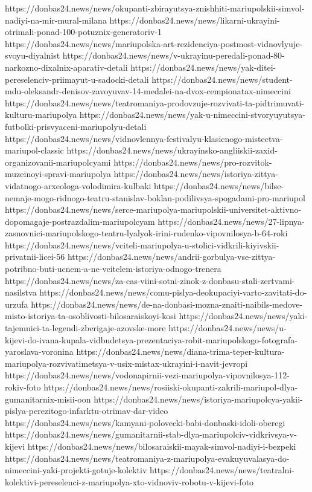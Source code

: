 https://donbas24.news/news/okupanti-zbirayutsya-znishhiti-mariupolskii-simvol-nadiyi-na-mir-mural-milana
https://donbas24.news/news/likarni-ukrayini-otrimali-ponad-100-potuznix-generatoriv-1
https://donbas24.news/news/mariupolska-art-rezidenciya-postmost-vidnovlyuje-svoyu-diyalnist
https://donbas24.news/news/v-ukrayinu-peredali-ponad-80-narkozno-dixalnix-aparativ-detali
https://donbas24.news/news/yak-ditei-pereselenciv-priimayut-u-sadocki-detali
https://donbas24.news/news/student-mdu-oleksandr-denisov-zavoyuvav-14-medalei-na-dvox-cempionatax-nimeccini
https://donbas24.news/news/teatromaniya-prodovzuje-rozvivati-ta-pidtrimuvati-kulturu-mariupolya
https://donbas24.news/news/yak-u-nimeccini-stvoryuyutsya-futbolki-prisvyaceni-mariupolyu-detali
https://donbas24.news/news/vidnovlennya-festivalyu-klasicnogo-mistectva-mariupol-classic
https://donbas24.news/news/ukrayinsko-angliiskii-zaxid-organizovanii-mariupolcyami
https://donbas24.news/news/pro-rozvitok-muzeinoyi-spravi-mariupolya
https://donbas24.news/news/istoriya-zittya-vidatnogo-arxeologa-volodimira-kulbaki
https://donbas24.news/news/bilse-nemaje-mogo-ridnogo-teatru-stanislav-boklan-podilivsya-spogadami-pro-mariupol
https://donbas24.news/news/serce-mariupolya-mariupolskii-universitet-aktivno-dopomagaje-postrazdalim-mariupolcyam
https://donbas24.news/news/27-lipnya-zasnovnici-mariupolskogo-teatru-lyalyok-irini-rudenko-vipovnilosya-b-64-roki
https://donbas24.news/news/vciteli-mariupolya-u-stolici-vidkrili-kiyivskii-privatnii-licei-56
https://donbas24.news/news/andrii-gorbulya-vse-zittya-potribno-buti-ucnem-a-ne-vcitelem-istoriya-odnogo-trenera
https://donbas24.news/news/za-cas-viini-sotni-zinok-z-donbasu-stali-zertvami-nasilstva
https://donbas24.news/news/comu-pislya-deokupaciyi-varto-zavitati-do-urzufa
https://donbas24.news/news/de-na-donbasi-mozna-znaiti-naibils-medove-misto-istoriya-ta-osoblivosti-bilosaraiskoyi-kosi
https://donbas24.news/news/yaki-tajemnici-ta-legendi-zberigaje-azovske-more
https://donbas24.news/news/u-kijevi-do-ivana-kupala-vidbudetsya-prezentaciya-robit-mariupolskogo-fotografa-yaroslava-voronina
https://donbas24.news/news/diana-trima-teper-kultura-mariupolya-rozvivatimetsya-v-usix-mistax-ukrayini-i-navit-jevropi
https://donbas24.news/news/vodonapirnii-vezi-mariupolya-vipovnilosya-112-rokiv-foto
https://donbas24.news/news/rosiiski-okupanti-zakrili-mariupol-dlya-gumanitarnix-misii-oon
https://donbas24.news/news/istoriya-mariupolcya-yakii-pislya-perezitogo-infarktu-otrimav-dar-video
https://donbas24.news/news/kamyani-polovecki-babi-donbaski-idoli-oberegi
https://donbas24.news/news/gumanitarnii-stab-dlya-mariupolciv-vidkrivsya-v-kijevi
https://donbas24.news/news/bilosaraiskii-mayak-simvol-nadiyi-i-bezpeki
https://donbas24.news/news/teatromaniya-z-mariupolya-evakuyuvalasya-do-nimeccini-yaki-projekti-gotuje-kolektiv
https://donbas24.news/news/teatralni-kolektivi-pereselenci-z-mariupolya-xto-vidnoviv-robotu-v-kijevi-foto


